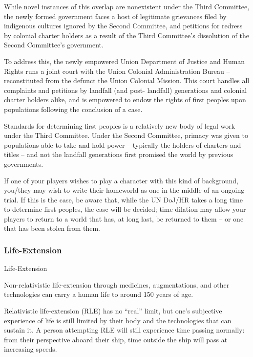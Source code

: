 While novel instances of this overlap are nonexistent under the Third Committee, the newly  
formed government faces a host of legitimate grievances filed by indigenous cultures ignored by  
the Second Committee, and petitions for redress by colonial charter holders as a result of the  
Third Committee’s dissolution of the Second Committee’s government. 
 

To address this, the newly empowered Union Department of Justice and Human Rights runs a  
joint court with the Union Colonial Administration Bureau -- reconstituted from the defunct the  
Union Colonial Mission. This court handles all complaints and petitions by landfall (and post- 
landfall) generations and colonial charter holders alike, and is empowered to endow the rights of  
first peoples upon populations following the conclusion of a case. 
 

Standards for determining first peoples is a relatively new body of legal work under the Third  
Committee. Under the Second Committee, primacy was given to populations able to take and  
hold power -- typically the holders of charters and titles -- and not the landfall generations first  
promised the world by previous governments.    

If one of your players wishes to play a character with this kind of background, you/they may wish  
to write their homeworld as one in the middle of an ongoing trial. If this is the case, be aware  
that, while the UN DoJ/HR takes a long time to determine first peoples, the case will be decided;  
time dilation may allow your players to return to a world that has, at long last, be returned to  
them -- or one that has been stolen from them.   
\subsubsection{Life-Extension}
Life-Extension  

Non-relativistic life-extension through medicines, augmentations, and other technologies can  
carry a human life to around 150 years of age.
 

Relativistic life-extension (RLE) has no “real” limit, but one’s subjective experience of life is still  
limited by their body and the technologies that can sustain it. A person attempting RLE will still  
experience time passing normally: from their perspective aboard their ship, time outside the ship  
will pass at increasing speeds. 
 

                                                                                                              


